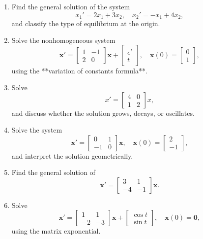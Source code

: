 \begin{question}
\begin{enumerate}
          \item Find the general solution of the system
          \[
              x_1' = 2x_1 + 3x_2, \quad x_2' = -x_1 + 4x_2,
          \]
          and classify the type of equilibrium at the origin.

          \item Solve the nonhomogeneous system
          \[
              \mathbf{x}' = \begin{bmatrix} 1 & -1 \\ 2 & 0 \end{bmatrix} \mathbf{x} + \begin{bmatrix} e^t \\ t \end{bmatrix}, \quad \mathbf{x}(0) = \begin{bmatrix} 0 \\ 1 \end{bmatrix},
          \]
          using the **variation of constants formula**.

          \item Solve
          \[
              x' = \begin{bmatrix} 4 & 0 \\ 1 & 2 \end{bmatrix} x,
          \]
          and discuss whether the solution grows, decays, or oscillates.

          \item Solve the system
          \[
              \mathbf{x}' = \begin{bmatrix} 0 & 1 \\ -1 & 0 \end{bmatrix} \mathbf{x}, \quad \mathbf{x}(0) = \begin{bmatrix} 2 \\ -1 \end{bmatrix},
          \]
          and interpret the solution geometrically.

          \item Find the general solution of
          \[
              \mathbf{x}' = \begin{bmatrix} 3 & 1 \\ -4 & -1 \end{bmatrix} \mathbf{x}.
          \]

          \item Solve
          \[
              \mathbf{x}' = \begin{bmatrix} 1 & 1 \\ -2 & -3 \end{bmatrix} \mathbf{x} + \begin{bmatrix} \cos t \\ \sin t \end{bmatrix}, \quad \mathbf{x}(0) = \mathbf{0},
          \]
          using the matrix exponential.
        \end{enumerate}
      \end{question}
      
